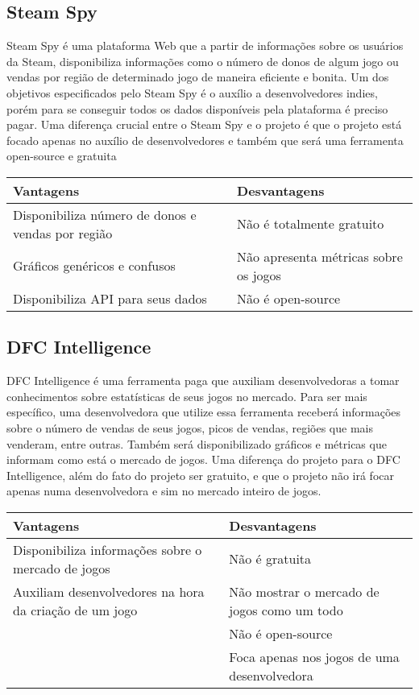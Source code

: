 \subsection*{Steam Spy}
Steam Spy é uma plataforma Web que a partir de informações sobre os usuários da Steam, disponibiliza informações como o número de donos de algum jogo ou vendas por região de determinado jogo de maneira eficiente e bonita\cite{steam_spy}. Um dos objetivos especificados pelo Steam Spy é o auxílio a desenvolvedores indies, porém para se conseguir todos os dados disponíveis pela plataforma é preciso pagar. Uma diferença crucial entre o Steam Spy e o projeto é que o projeto está focado apenas no auxílio de desenvolvedores e também que será uma ferramenta open-source e gratuita
\begin{center}
\begin{tabular}{|p{7cm}|p{7cm}|}
\hline \textbf{Vantagens} & \textbf{Desvantagens}
\\
\hline Disponibiliza número de donos e vendas por região & Não é totalmente gratuito
\\
\hline Gráficos genéricos e confusos & Não apresenta métricas sobre os jogos
\\
\hline Disponibiliza API para seus dados & Não é open-source
\\
\hline
\end{tabular}
\end{center}
\subsection*{DFC Intelligence}
DFC Intelligence é uma ferramenta paga que auxiliam desenvolvedoras a tomar conhecimentos sobre estatísticas de seus jogos no mercado. Para ser mais específico, uma desenvolvedora que utilize essa ferramenta receberá informações sobre o número de vendas de seus jogos, picos de vendas, regiões que mais venderam, entre outras. Também será disponibilizado gráficos e métricas que informam como está o mercado de jogos\cite{dfc_intelligence}. Uma diferença do projeto para o DFC Intelligence, além do fato do projeto ser gratuito, e que o projeto não irá focar apenas numa desenvolvedora e sim no mercado inteiro de jogos.
\begin{center}
\begin{tabular}{|p{7cm}|p{7cm}|}
\hline \textbf{Vantagens} & \textbf{Desvantagens}
\\
\hline Disponibiliza informações sobre o mercado de jogos & Não é gratuita
\\
\hline Auxiliam desenvolvedores na hora da criação de um jogo & Não mostrar o mercado de jogos como um todo
\\
\hline & Não é open-source
\\
\hline & Foca apenas nos jogos de uma desenvolvedora
\\
\hline
\end{tabular}
\end{center}